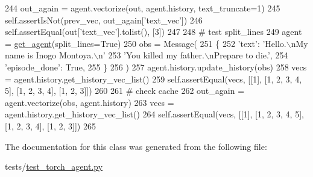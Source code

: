 \begin{DoxyCode}
244             out\_again = agent.vectorize(out, agent.history, text\_truncate=1)
245             self.assertIsNot(prev\_vec, out\_again[\textcolor{stringliteral}{'text\_vec'}])
246             self.assertEqual(out[\textcolor{stringliteral}{'text\_vec'}].tolist(), [3])
247 
248         \textcolor{comment}{# test split\_lines}
249         agent = \hyperlink{namespacetests_1_1test__torch__agent_ae929d109305aaea29fbfa13ecf1f32e9}{get\_agent}(split\_lines=\textcolor{keyword}{True})
250         obs = Message(
251             \{
252                 \textcolor{stringliteral}{'text'}: \textcolor{stringliteral}{'Hello.\(\backslash\)nMy name is Inogo Montoya.\(\backslash\)n'}
253                 \textcolor{stringliteral}{'You killed my father.\(\backslash\)nPrepare to die.'},
254                 \textcolor{stringliteral}{'episode\_done'}: \textcolor{keyword}{True},
255             \}
256         )
257         agent.history.update\_history(obs)
258         vecs = agent.history.get\_history\_vec\_list()
259         self.assertEqual(vecs, [[1], [1, 2, 3, 4, 5], [1, 2, 3, 4], [1, 2, 3]])
260 
261         \textcolor{comment}{# check cache}
262         out\_again = agent.vectorize(obs, agent.history)
263         vecs = agent.history.get\_history\_vec\_list()
264         self.assertEqual(vecs, [[1], [1, 2, 3, 4, 5], [1, 2, 3, 4], [1, 2, 3]])
265 
\end{DoxyCode}


The documentation for this class was generated from the following file\+:\begin{DoxyCompactItemize}
\item 
tests/\hyperlink{test__torch__agent_8py}{test\+\_\+torch\+\_\+agent.\+py}\end{DoxyCompactItemize}
